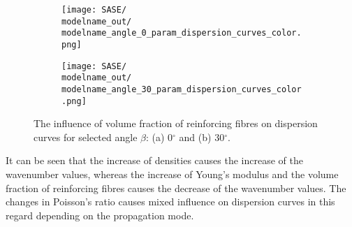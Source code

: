 \documentclass[preprint,12pt]{elsarticle}
\begin{document}
\begin{figure} [h!]
	\centering
	\newcommand{\modelname}{SASE8_plain_weave}
	\begin{subfigure}[b]{0.49\textwidth}
		\centering
		\texttt{[image: SASE/\\modelname\_out/\\modelname\_angle\_0\_param\_dispersion\_curves\_color.png]}
		\caption{}
		\label{fig:vol0}
	\end{subfigure}
	\hfill
	\begin{subfigure}[b]{0.49\textwidth}
		\centering
		\texttt{[image: SASE/\\modelname\_out/\\modelname\_angle\_30\_param\_dispersion\_curves\_color.png]}
		\caption{}
		\label{fig:vol30}
	\end{subfigure}
	\caption{The influence of volume fraction of reinforcing fibres on dispersion curves for selected angle $\beta$: (a) 0$^{\circ}$ and (b) 30$^{\circ}$.} 
	\label{fig:vol}
\end{figure}

It can be seen that the increase of densities causes the increase of the wavenumber values, whereas the increase of  Young's modulus and the volume fraction of reinforcing fibres causes the decrease of the wavenumber values. The changes in Poisson's ratio causes mixed influence on dispersion curves in this regard depending on the propagation mode.
\end{document}
